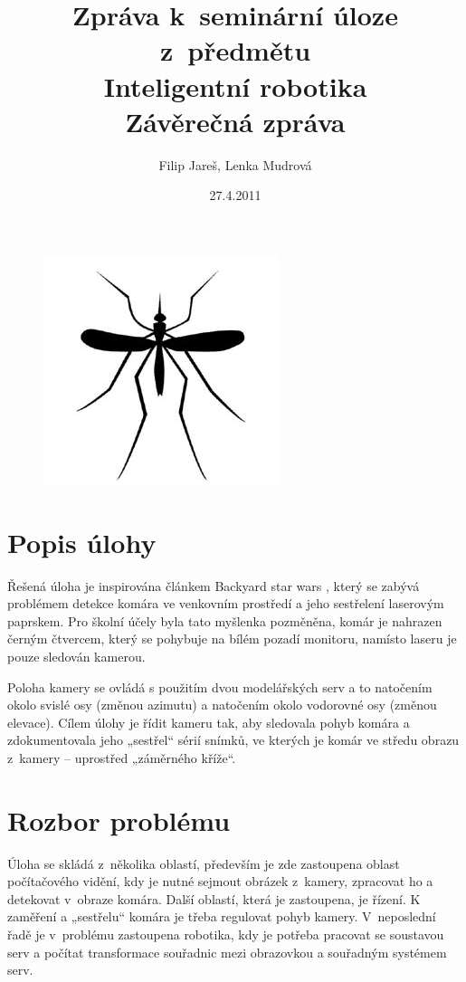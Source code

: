 \documentclass[a4paper,10pt]{article}
\title{Zpráva k~seminární úloze z~předmětu\\ Inteligentní robotika \\ {\small Závěrečná zpráva}}
\author{Filip Jareš, Lenka Mudrová}
\date{27.4.2011}
\begin{document}
\pagestyle{empty}

\maketitle

\begin{figure}[!h]
	\centering
	\includegraphics[width=0.4\columnwidth]{pics/mosquito}
	\caption{\cite{komar}}\label{fig:m}
\end{figure}
\newpage

\pagestyle{plain}
\section{Popis úlohy}
		Řešená úloha je inspirována článkem Backyard star wars \cite{zadani}, který se zabývá problémem
		detekce komára ve venkovním prostředí a jeho sestřelení laserovým paprskem. 
		Pro školní účely byla tato myšlenka pozměněna, komár je nahrazen černým čtvercem, který se pohybuje na bílém
		pozadí monitoru, namísto laseru je pouze sledován kamerou.

		Poloha kamery se ovládá s použitím dvou modelářských serv a to  
		natočením okolo svislé osy (změnou azimutu) a natočením okolo vodorovné osy (změnou elevace). Cílem úlohy
		je řídit kameru tak, aby sledovala pohyb komára a zdokumentovala jeho „sestřel“
		sérií snímků, ve kterých je komár ve středu obrazu z~kamery – uprostřed
		„záměrného kříže“.

		

\section{Rozbor problému}
		Úloha se skládá z~několika oblastí, především je zde zastoupena oblast
		po\-čí\-ta\-čo\-vé\-ho vidění, kdy je nutné sejmout obrázek z~kamery, zpracovat ho a
		detekovat v~obraze komára. 
		Další oblastí, která je zastoupena, je řízení. K zaměření a „sestřelu“ komára je
		třeba regulovat pohyb kamery.
		V~neposlední řadě je v~problému zastoupena robotika, kdy je potřeba pracovat se
		soustavou serv a počítat transformace souřadnic mezi obrazovkou a souřadným
		systémem serv.
\end{document}
